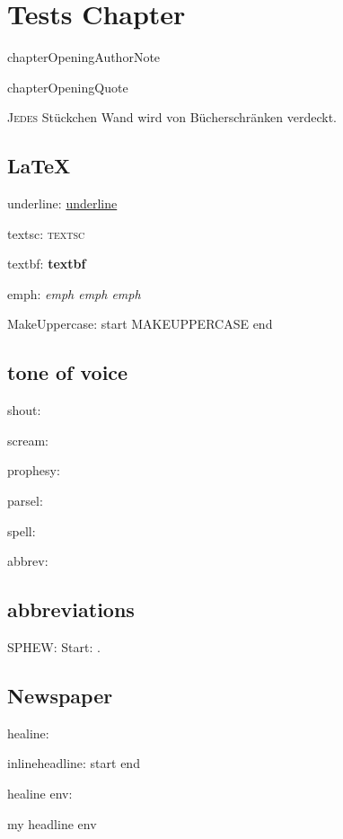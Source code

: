 \chapter{Tests Chapter}

\begin{chapterOpeningAuthorNote}
chapterOpeningAuthorNote
\end{chapterOpeningAuthorNote}
\begin{chapterOpeningQuote}
chapterOpeningQuote
\end{chapterOpeningQuote}

\lettrine{J}{edes} Stückchen Wand wird von Bücherschränken verdeckt.

\section{\LaTeX}
underline: \underline{underline}

textsc: \textsc{textsc}

textbf: \textbf{textbf}

emph: \emph{emph \emph{emph} emph}

MakeUppercase: start \MakeUppercase{MakeUppercase} end

\section{tone of voice}

shout: 

scream: 

prophesy: 

parsel: 

spell: 

abbrev: 

\section{abbreviations}
SPHEW: Start: \SPHEW.

\section{Newspaper}

healine: 

inlineheadline: start  end

healine env:
\begin{headlines}
my headline env
\end{headlines}

